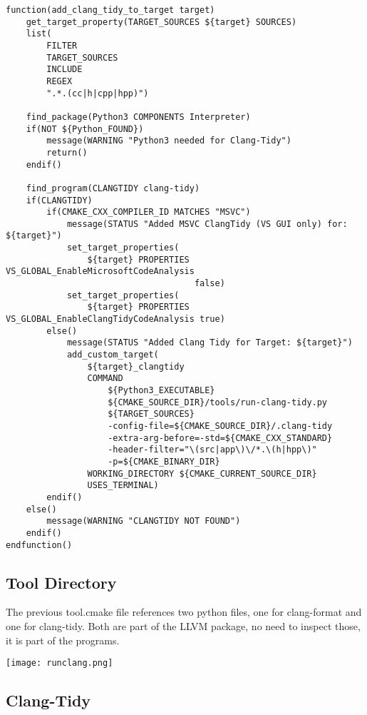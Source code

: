 \documentclass[openany]{report}
\begin{document}
\begin{verbatim}
function(add_clang_tidy_to_target target)
    get_target_property(TARGET_SOURCES ${target} SOURCES)
    list(
        FILTER
        TARGET_SOURCES
        INCLUDE
        REGEX
        ".*.(cc|h|cpp|hpp)")

    find_package(Python3 COMPONENTS Interpreter)
    if(NOT ${Python_FOUND})
        message(WARNING "Python3 needed for Clang-Tidy")
        return()
    endif()

    find_program(CLANGTIDY clang-tidy)
    if(CLANGTIDY)
        if(CMAKE_CXX_COMPILER_ID MATCHES "MSVC")
            message(STATUS "Added MSVC ClangTidy (VS GUI only) for: ${target}")
            set_target_properties(
                ${target} PROPERTIES VS_GLOBAL_EnableMicrosoftCodeAnalysis
                                     false)
            set_target_properties(
                ${target} PROPERTIES VS_GLOBAL_EnableClangTidyCodeAnalysis true)
        else()
            message(STATUS "Added Clang Tidy for Target: ${target}")
            add_custom_target(
                ${target}_clangtidy
                COMMAND
                    ${Python3_EXECUTABLE}
                    ${CMAKE_SOURCE_DIR}/tools/run-clang-tidy.py
                    ${TARGET_SOURCES}
                    -config-file=${CMAKE_SOURCE_DIR}/.clang-tidy
                    -extra-arg-before=-std=${CMAKE_CXX_STANDARD}
                    -header-filter="\(src|app\)\/*.\(h|hpp\)"
                    -p=${CMAKE_BINARY_DIR}
                WORKING_DIRECTORY ${CMAKE_CURRENT_SOURCE_DIR}
                USES_TERMINAL)
        endif()
    else()
        message(WARNING "CLANGTIDY NOT FOUND")
    endif()
endfunction()
\end{verbatim}


\subsection{Tool Directory}

The previous tool.cmake file references two python files, one for clang-format and one for clang-tidy.
Both are part of the LLVM package, no need to inspect those, it is part of the programs.

\begin{center}
    \texttt{[image: runclang.png]}
\end{center}

\subsection{Clang-Tidy}
\end{document}

